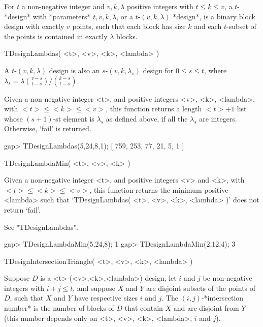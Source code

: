 %
%
%
%
\def\DESIGN{\sf DESIGN}
\def\GRAPE{\sf GRAPE}
\def\nauty{\it nauty}
\def\Aut{{\rm Aut}\,}
\def\x{\times}


For $t$ a non-negative integer and $v,k,\lambda$ positive integers
with $t\le k\le v$, a $t$-*design*
with *parameters*
$t,v,k,\lambda$, or a $t$-$(v,k,\lambda)$ *design*, is a binary block
design with exactly $v$ points, such that each block has size $k$ and
each $t$-subset of the points is contained in exactly $\lambda$ blocks.

\>TDesignLambdas( <t>, <v>, <k>, <lambda> )

A $t$-$(v,k,\lambda)$ design is also an $s$-$(v,k,\lambda_s)$ design
for $0\le s\le t$, where $\lambda_s=\lambda{v-s \choose t-s}/{k-s
\choose t-s}$.

Given a non-negative integer <t>, and positive integers <v>, <k>,
<lambda>, with $<t>\le <k>\le <v>$, this function returns a length
$<t>+1$ list whose $(s+1)$-st element is $\lambda_s$ as defined above,
if all the $\lambda_s$ are integers. Otherwise, `fail' is returned.

\beginexample
gap> TDesignLambdas(5,24,8,1);
[ 759, 253, 77, 21, 5, 1 ]
\endexample



\>TDesignLambdaMin( <t>, <v>, <k> )

Given a non-negative integer <t>, and positive integers <v> and <k>, with
$<t>\le <k>\le <v>$, this function returns the minimum positive <lambda>
such that `TDesignLambdas( <t>, <v>, <k>, <lambda> )' does not return
`fail'.

See "TDesignLambdas". 

\beginexample
gap> TDesignLambdaMin(5,24,8);  
1
gap> TDesignLambdaMin(2,12,4);
3
\endexample



\>TDesignIntersectionTriangle( <t>, <v>, <k>, <lambda> )

Suppose $D$ is a <t>-(<v>,<k>,<lambda>) design, let $i$ and $j$
be non-negative integers with $i+j\le t$, and suppose $X$ and $Y$
are disjoint subsets of the points of $D$, such that $X$ and $Y$ have
respective sizes $i$ and $j$. The $(i,j)$-*intersection number* is
the number of blocks of $D$ that contain $X$ and are disjoint from $Y$
(this number depends only on <t>, <v>, <k>, <lambda>, $i$ and $j$).

